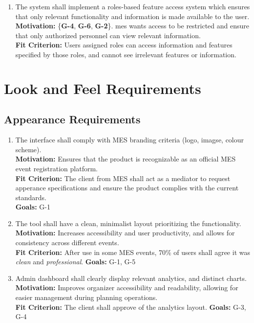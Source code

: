 \documentclass[12pt]{article}
\begin{document}
\begin{enumerate}[align=left,
  leftmargin=*,
  labelsep=1em,
  itemindent=0em,
  label=\bfseries FR-\arabic*:,
  ref=\bfseries FR-\arabic*]
    once an event has completed.\\[2mm]
  {\bf Motivation:} \{\textbf{G-5}, \textbf{G-4}, \textbf{G-3}\}. See \ref{FR9}.\\
  {\bf Fit Criterion:} See \ref{FR9}.
  \item \label{FR11} The system shall implement a roles-based feature access system which ensures that only relevant
    functionality and information is made available to the user.\\[2mm]
    {\bf Motivation:} \{{\bf G-4}, {\bf G-6}, {\bf G-2}\}. \Gls{mes} wants access to be restricted and ensure that
    only authorized personnel can view relevant information.\\
    {\bf Fit Criterion:} Users assigned roles can access information and features specified by those roles, and cannot
    see irrelevant features or information.
\end{enumerate}

\section{Look and Feel Requirements}
\subsection{Appearance Requirements}
\begin{enumerate}[label=\bfseries AR-\arabic*:, wide=0pt, leftmargin=*, 
  ref=\bfseries LFR-AP.\arabic*]
  \item \label{LFAR1} The interface shall comply with MES branding criteria (logo, imagse, colour scheme).\\[2mm]
    {\bf Motivation:} Ensures that the product is recognizable as an official MES event registration platform.\\
    {\bf Fit Criterion:} The client from MES shall act as a mediator to request apperance specifications and ensure the product complies with the current standards.\\
    {\bf Goals:} G-1
  \item \label{LFAR2} The tool shall have a clean, minimalist layout prioritizing the functionality.\\[2mm]
    {\bf Motivation:} Increases accessibility and user productivity, and allows for consistency across different events.\\
    {\bf Fit Criterion:} After use in some MES events, 70\% of users shall agree it was \textit{clean} and \textit{professional}.
    {\bf Goals:} G-1, G-5
  \item \label{LFAR3} Admin dashboard shall clearly display relevant analytics, and distinct charts.\\[2mm]
    {\bf Motivation:} Improves organizer accessibility and readability, allowing for easier management during planning operations.\\
    {\bf Fit Criterion:} The client shall approve of the analytics layout.
    {\bf Goals:} G-3, G-4
\end{enumerate}
\end{document}

